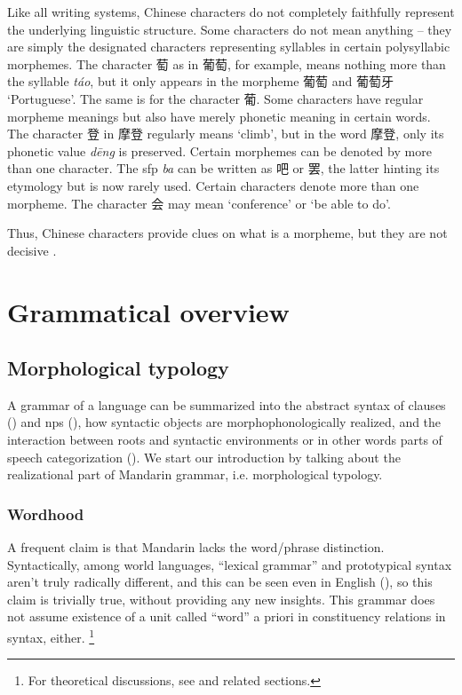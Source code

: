 \documentclass[UTF8, a4paper, oneside, scheme=plain, 12pt]{ctexrep}
\newcommand{\form}[1]{\emph{#1}}
\newcommand{\translate}[1]{`#1'}
\begin{document}
Like all writing systems, 
Chinese characters do not completely faithfully represent 
the underlying linguistic structure.
Some characters do not mean anything -- 
they are simply the designated characters representing syllables 
in certain polysyllabic morphemes.
The character 萄 as in 葡萄, for example, 
means nothing more than the syllable \form{t\'{a}o},
but it only appears in the morpheme 葡萄 and 葡萄牙 \translate{Portuguese}.
The same is for the character 葡.
Some characters have regular morpheme meanings
but also have merely phonetic meaning in certain words.
The character 登 in 摩登 regularly means \translate{climb},
but in the word 摩登, only its phonetic value \form{d\={e}ng} is preserved.
Certain morphemes can be denoted by more than one character.
The \ac{sfp} \form{ba} can be written as 吧 or 罢,
the latter hinting its etymology but is now rarely used.
Certain characters denote more than one morpheme.
The character 会 may mean \translate{conference} or \translate{be able to do}. 

Thus, Chinese characters provide clues on what is a morpheme,
but they are not decisive \citep[1.1.4]{zhudexigrammar}.


\chapter{Grammatical overview}

\section{Morphological typology}

A grammar of a language can be summarized into the abstract syntax of clauses () and \acp{np} (),
how syntactic objects are morphophonologically realized,
and the interaction between roots and syntactic environments
or in other words parts of speech categorization
().
We start our introduction by talking about the realizational part of Mandarin grammar,
i.e. morphological typology.

\subsection{Wordhood}\label{sec:grammatical.wordhood}

A frequent claim is that Mandarin lacks the word/phrase distinction.
Syntactically, among world languages,
``lexical grammar'' and prototypical syntax aren't truly radically different,
and this can be seen even in English (),
so this claim is trivially true, without providing any new insights.
This grammar does not assume existence of a unit called ``word'' a priori in constituency relations in syntax, either.%
\footnote{
    For theoretical discussions, see  and related sections.
}
\end{document}
